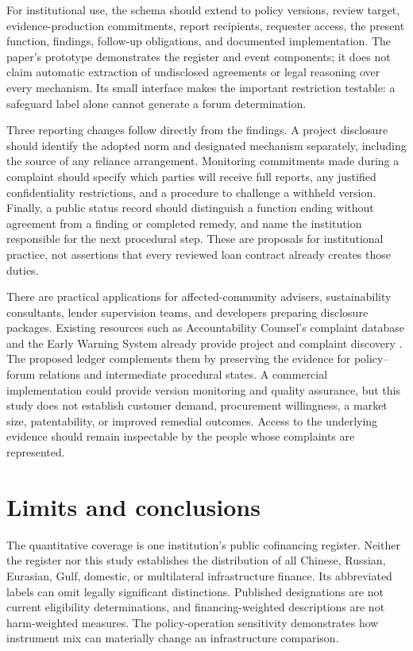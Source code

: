\documentclass[11pt,a4paper]{article}
\begin{document}
For institutional use, the schema should extend to policy versions, review target, evidence-production commitments, report recipients, requester access, the present function, findings, follow-up obligations, and documented implementation. The paper's prototype demonstrates the register and event components; it does not claim automatic extraction of undisclosed agreements or legal reasoning over every mechanism. Its small interface makes the important restriction testable: a safeguard label alone cannot generate a forum determination.

Three reporting changes follow directly from the findings. A project disclosure should identify the adopted norm and designated mechanism separately, including the source of any reliance arrangement. Monitoring commitments made during a complaint should specify which parties will receive full reports, any justified confidentiality restrictions, and a procedure to challenge a withheld version. Finally, a public status record should distinguish a function ending without agreement from a finding or completed remedy, and name the institution responsible for the next procedural step. These are proposals for institutional practice, not assertions that every reviewed loan contract already creates those duties.

There are practical applications for affected-community advisers, sustainability consultants, lender supervision teams, and developers preparing disclosure packages. Existing resources such as Accountability Counsel's complaint database and the Early Warning System already provide project and complaint discovery \citep{console,ews}. The proposed ledger complements them by preserving the evidence for policy--forum relations and intermediate procedural states. A commercial implementation could provide version monitoring and quality assurance, but this study does not establish customer demand, procurement willingness, a market size, patentability, or improved remedial outcomes. Access to the underlying evidence should remain inspectable by the people whose complaints are represented.

\section{Limits and conclusions}
The quantitative coverage is one institution's public cofinancing register. Neither the register nor this study establishes the distribution of all Chinese, Russian, Eurasian, Gulf, domestic, or multilateral infrastructure finance. Its abbreviated labels can omit legally significant distinctions. Published designations are not current eligibility determinations, and financing-weighted descriptions are not harm-weighted measures. The policy-operation sensitivity demonstrates how instrument mix can materially change an infrastructure comparison.
\end{document}
